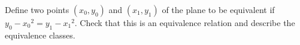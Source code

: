 \documentclass[../main.tex]{subfiles}
\begin{document}
\problem{}\label{s3p1}

Define two points \((x_0,y_0)\) and \((x_1,y_1)\) of the plane to be equivalent
if \(y_0 - {x_0}^2 = y_1 - {x_1}^2\). Check that this is an equivalence relation
and describe the equivalence classes.

%
\end{document}
